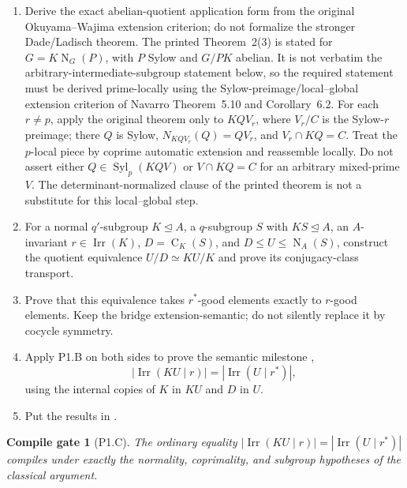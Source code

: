 \documentclass[11pt]{article}
\newtheorem{gate}{Compile gate}
\newcommand{\Irr}{\operatorname{Irr}}
\newcommand{\Norm}{\operatorname{N}}
\newcommand{\Cent}{\operatorname{C}}
\newcommand{\Syl}{\operatorname{Syl}}
\begin{document}
\begin{enumerate}[label=\textbf{P1.C\arabic*.},leftmargin=*]
  \item Derive the exact abelian-quotient application form from the original
  Okuyama--Wajima extension criterion; do not formalize the stronger
  Dade/Ladisch theorem.  The printed Theorem~2(3) is stated for
  \(G=K\Norm_G(P)\), with \(P\) Sylow and \(G/PK\) abelian.  It is not
  verbatim the arbitrary-intermediate-subgroup statement below, so the
  required statement must be derived prime-locally using the
  Sylow-preimage/local--global extension criterion of Navarro
  Theorem~5.10 and Corollary~6.2.  For each \(r\ne p\), apply the original
  theorem only to \(KQV_r\), where \(V_r/C\) is the Sylow-\(r\) preimage;
  there \(Q\) is Sylow, \(N_{KQV_r}(Q)=QV_r\), and
  \(V_r\cap KQ=C\).  Treat the \(p\)-local piece by coprime automatic
  extension and reassemble locally.  Do not assert either \(Q\in
  \Syl_p(KQV)\) or \(V\cap KQ=C\) for an arbitrary mixed-prime \(V\).
  The determinant-normalized clause of the printed theorem is not a
  substitute for this local--global step.
  \item For a normal \(q'\)-subgroup \(K\trianglelefteq A\), a
  \(q\)-subgroup \(S\) with \(KS\trianglelefteq A\), an
  \(A\)-invariant \(r\in\Irr(K)\), \(D=\Cent_K(S)\), and
  \(D\leq U\leq\Norm_A(S)\), construct the quotient equivalence
  \(U/D\simeq KU/K\) and prove its conjugacy-class transport.
  \item Prove that this equivalence takes \(r^*\)-good elements exactly to
  \(r\)-good elements.  Keep the bridge extension-semantic; do not silently
  replace it by cocycle symmetry.
  \item Apply P1.B on both sides to prove the semantic milestone
  ,
  \[
    |\Irr(KU\mid r)|=|\Irr(U\mid r^*)|,
  \]
  using the internal copies of \(K\) in \(KU\) and \(D\) in \(U\).
  \item Put the results in
  .
\end{enumerate}

\begin{gate}[P1.C]
The ordinary equality \(|\Irr(KU\mid r)|=|\Irr(U\mid r^*)|\) compiles under
exactly the normality, coprimality, and subgroup hypotheses of the
classical argument.
\end{gate}
\end{document}
